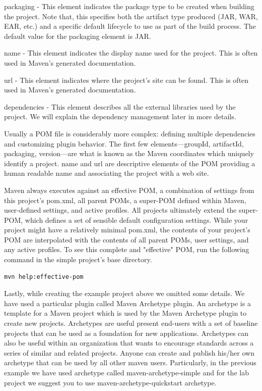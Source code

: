 \documentclass{article}
\begin{document}
\begin{compactitem}
\item packaging - This element indicates the package type to be
  created when building the project. Note that, this specifies both
  the artifact type produced (JAR, WAR, EAR, etc.) and a
  specific default lifecycle to use as part of the build process.
  The default value for the packaging element is JAR.

\item name - This element indicates the display name used for the
  project. This is often used in Maven's generated documentation. 

\item url - This element indicates where the project's site can be
  found. This is often used in Maven's generated documentation.

\item dependencies - This element describes all the external libraries
  used by the project. We will explain the dependency management later
  in more details.
\end{compactitem}

Usually a POM file is considerably more complex: defining multiple
dependencies and customizing plugin behavior. The first few
elements—groupId, artifactId, packaging, version—are what is known as
the Maven coordinates which uniquely identify a project. name and url
are descriptive elements of the POM providing a human readable name
and associating the project with a web site.

Maven always executes against an effective POM, a combination of
settings from this project’s pom.xml, all parent POMs, a super-POM
defined within Maven, user-defined settings, and active profiles. All
projects ultimately extend the super-POM, which defines a set of
sensible default configuration settings. While your project might have
a relatively minimal pom.xml, the contents of your project’s POM are
interpolated with the contents of all parent POMs, user settings, and
any active profiles. To see this complete and "effective" POM, run the
following command in the simple project’s base directory.
\begin{lstlisting}
mvn help:effective-pom
\end{lstlisting}

Lastly, while creating the example project above we omitted some
details. We have used a particular plugin called Maven Archetype
plugin.
An archetype is a template for a Maven project which is used by the
Maven Archetype plugin to create new projects. Archetypes are useful
present end-users with a set of baseline projects that can be
used as a foundation for new applications. Archetypes can also be
useful within an organization that wants to encourage standards across
a series of similar and related projects. Anyone can create and publish
his/her own archetype that can be used by all other maven users.
Particularly, in the previous example we have used archetype called
maven-archetype-simple and for the lab project we suggest you to use
maven-archetype-quickstart archetype.
\end{document}
